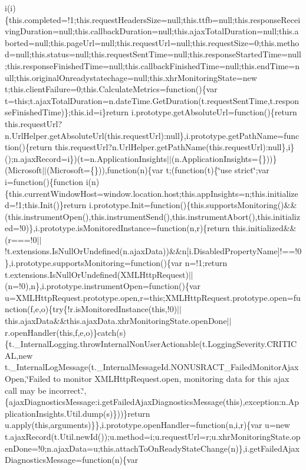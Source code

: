 i(i)\{this.\+completed=!1;this.\+request\+Headers\+Size=null;this.\+ttfb=null;this.\+response\+Receiving\+Duration=null;this.\+callback\+Duration=null;this.\+ajax\+Total\+Duration=null;this.\+aborted=null;this.\+page\+Url=null;this.\+request\+Url=null;this.\+request\+Size=0;this.\+method=null;this.\+status=null;this.\+request\+Sent\+Time=null;this.\+response\+Started\+Time=null;this.\+response\+Finished\+Time=null;this.\+callback\+Finished\+Time=null;this.\+end\+Time=null;this.\+original\+Onreadystatechage=null;this.\+xhr\+Monitoring\+State=new t;this.\+client\+Failure=0;this.\+Calculate\+Metrics=function()\{var t=this;t.\+ajax\+Total\+Duration=n.\+date\+Time.\+Get\+Duration(t.\+request\+Sent\+Time,t.\+response\+Finished\+Time)\};this.\+id=i\}return i.\+prototype.\+get\+Absolute\+Url=function()\{return this.\+request\+Url?n.\+Url\+Helper.\+get\+Absolute\+Url(this.\+request\+Url)\+:null\},i.\+prototype.\+get\+Path\+Name=function()\{return this.\+request\+Url?n.\+Url\+Helper.\+get\+Path\+Name(this.\+request\+Url)\+:null\},i\}();n.\+ajax\+Record=i\})(t=n.\+Application\+Insights$\vert$$\vert$(n.\+Application\+Insights=\{\}))\}(\+Microsoft$\vert$$\vert$(\+Microsoft=\{\})),function(n)\{var t;(function(t)\{\char`\"{}use strict\char`\"{};var i=function()\{function i(n)\{this.\+current\+Window\+Host=window.\+location.\+host;this.\+app\+Insights=n;this.\+initialized=!1;this.\+Init()\}return i.\+prototype.\+Init=function()\{this.\+supports\+Monitoring()\&\&(this.\+instrument\+Open(),this.\+instrument\+Send(),this.\+instrument\+Abort(),this.\+initialized=!0)\},i.\+prototype.\+is\+Monitored\+Instance=function(n,r)\{return this.\+initialized\&\&(r===!0$\vert$$\vert$!t.\+extensions.\+Is\+Null\+Or\+Undefined(n.\+ajax\+Data))\&\&n\mbox{[}i.\+Disabled\+Property\+Name\mbox{]}!==!0\},i.\+prototype.\+supports\+Monitoring=function()\{var n=!1;return t.\+extensions.\+Is\+Null\+Or\+Undefined(\+X\+M\+L\+Http\+Request)$\vert$$\vert$(n=!0),n\},i.\+prototype.\+instrument\+Open=function()\{var u=\+X\+M\+L\+Http\+Request.\+prototype.\+open,r=this;\+X\+M\+L\+Http\+Request.\+prototype.\+open=function(f,e,o)\{try\{!r.\+is\+Monitored\+Instance(this,!0)$\vert$$\vert$this.\+ajax\+Data\&\&this.\+ajax\+Data.\+xhr\+Monitoring\+State.\+open\+Done$\vert$$\vert$r.\+open\+Handler(this,f,e,o)\}catch(s)\{t.\+\_\+\+Internal\+Logging.\+throw\+Internal\+Non\+User\+Actionable(t.\+Logging\+Severity.\+C\+R\+I\+T\+I\+C\+A\+L,new t.\+\_\+\+Internal\+Log\+Message(t.\+\_\+\+Internal\+Message\+Id.\+N\+O\+N\+U\+S\+R\+A\+C\+T\+\_\+\+Failed\+Monitor\+Ajax\+Open,\char`\"{}\+Failed to monitor X\+M\+L\+Http\+Request.\+open, monitoring data for this ajax call may be incorrect.\char`\"{},\{ajax\+Diagnostics\+Message\+:i.\+get\+Failed\+Ajax\+Diagnostics\+Message(this),exception\+:n.\+Application\+Insights.\+Util.\+dump(s)\}))\}return u.\+apply(this,arguments)\}\},i.\+prototype.\+open\+Handler=function(n,i,r)\{var u=new t.\+ajax\+Record(t.\+Util.\+new\+Id());u.\+method=i;u.\+request\+Url=r;u.\+xhr\+Monitoring\+State.\+open\+Done=!0;n.\+ajax\+Data=u;this.\+attach\+To\+On\+Ready\+State\+Change(n)\},i.\+get\+Failed\+Ajax\+Diagnostics\+Message=function(n)\{var 